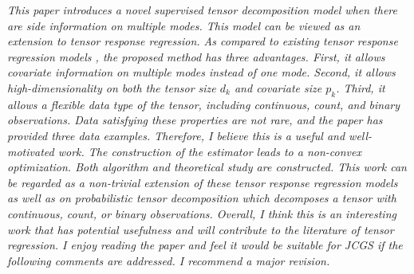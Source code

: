 \documentclass[11pt]{article}
\theoremstyle{plain}
\theoremstyle{definition}
\begin{document}
\textit{This paper introduces a novel supervised tensor decomposition model when there are side information on multiple modes. This model can be viewed as an extension to tensor response regression. As compared to existing tensor response regression models \citep{rabusseau2016low,li2017parsimonious,sun2017store}, the proposed method has three advantages. First, it allows covariate information on multiple modes instead of one mode. Second, it allows high-dimensionality on both the tensor size $d_k$ and covariate size $p_k$. Third, it allows a ﬂexible data type of the tensor, including continuous, count, and binary observations. Data satisfying these properties are not rare, and the paper has provided three data examples. Therefore, I believe this is a useful and well-motivated work. The construction of the estimator leads to a non-convex optimization. Both algorithm and theoretical study are constructed. This work can be regarded as a non-trivial extension of these tensor response regression models as well as \cite{wang2020learning} on probabilistic tensor decomposition which decomposes a tensor with continuous, count, or binary observations. Overall, I think this is an interesting work that has potential usefulness and will contribute to the literature of tensor regression. I enjoy reading the paper and feel it would be suitable for JCGS if the following comments are addressed. I recommend a major revision.}
\end{document}
